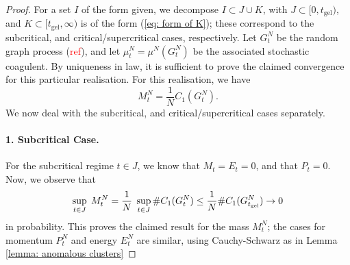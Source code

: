 \begin{proof} For a set $I$ of the form given, we decompose $I\subset J\cup K$, with $J\subset[0, t_\text{gel})$, and $K\subset [t_\text{gel}, \infty)$ is of the form (\ref{eq: form of K}); these correspond to the subcritical, and critical/supercritical cases, respectively. Let $G^N_t$ be the random graph process (\textcolor{red}{ref}), and let $\mu^N_t=\mu^N(G^N_t)$ be the associated stochastic coagulent. By uniqueness in law, it is sufficient to prove the claimed convergence for this particular realisation. For this realisation, we have \begin{equation}
    M^N_t = \frac{1}{N} C_1(G^N_t).
\end{equation} We now deal with the subcritical, and critical/supercritical cases separately. \paragraph{1. Subcritical Case.} For the subcritical regime $t\in J$, we know that $M_t=E_t=0$, and that $P_t=0$. Now, we observe that \begin{equation}
    \sup_{t\in J}\hspace{0.1cm} M^N_t =\frac{1}{N}\hspace{0.1cm} \sup_{t\in J} \#C_1(G^N_t) \leq \frac{1}{N}\#C_1(G^N_{t_\text{gel}}) \rightarrow 0
\end{equation} in probability. This proves the claimed result for the mass $M^N_t$; the cases for momentum $P^N_t$ and energy $E^N_t$ are similar, using Cauchy-Schwarz as in Lemma \ref{lemma: anomalous clusters}

\end{proof}

